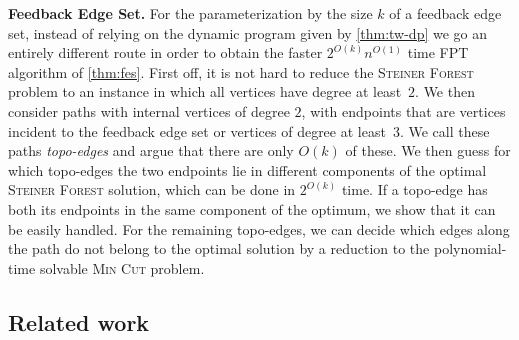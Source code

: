 \documentclass[a4paper]{article}
\theoremstyle{plain}
\newcommand{\pname}[1]{\textsc{#1}}
\newcommand{\SF}{\pname{Steiner Forest}\xspace}
\begin{document}
\smallskip
\textbf{Feedback Edge Set.} For the parameterization by the size $k$ of a
feedback edge set, instead of relying on the dynamic program given by
\autoref{thm:tw-dp} we go an entirely different route in order to obtain the
faster $2^{O(k)}n^{O(1)}$ time FPT algorithm of \autoref{thm:fes}. First off,
it is not hard to reduce the \SF problem to an instance in which all vertices
have degree at least~$2$.  We then consider paths with internal vertices of
degree $2$, with endpoints that are vertices incident to the feedback edge set
or vertices of degree at least~$3$.  We call these paths \emph{topo-edges} and
argue that there are only $O(k)$ of these. We then guess for which topo-edges
the two endpoints lie in different components of the optimal \SF solution,
which can be done in $2^{O(k)}$ time.  If a topo-edge has both its endpoints in
the same component of the optimum, we show that it can be easily handled. For
the remaining topo-edges, we can decide which edges along the path do not
belong to the optimal solution by a reduction to the polynomial-time solvable
\pname{Min Cut} problem.



%
%
%
%
%
%
%
%
%
%
%
%
%
%
%
%
%
%
%
%
%
%
%
%
%
%
%
%
%
%


%
%





\subsection{Related work}
\label{sec:related}
\end{document}
